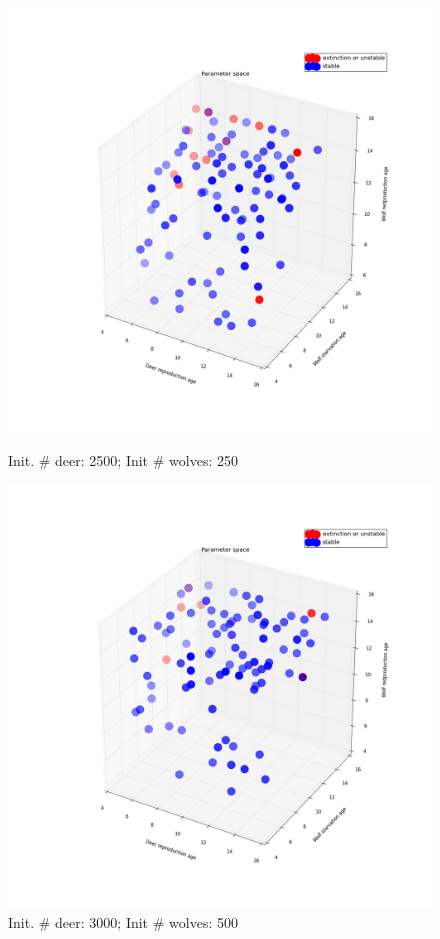 \documentclass[a4paper,12pt]{article}
\begin{document}
  \begin{figure}[ht]
  \centering
                \begin{minipage}[b]{.45\linewidth}
                        \includegraphics[width = 1\linewidth]{./pics/Restricted_Parameter_space_d2500_w250.png}
                    \caption{Init. $\#$ deer: 2500; Init $\#$ wolves: 250}
                \end{minipage}
                \quad
                \begin{minipage}[b]{.45\linewidth}
                \includegraphics[width = 1\linewidth]{./pics/Restricted_Parameter_space_d3000_w500.png}
                \caption{Init. $\#$ deer: 3000; Init $\#$ wolves: 500}
                \end{minipage}
  \end{figure}
\end{document}
